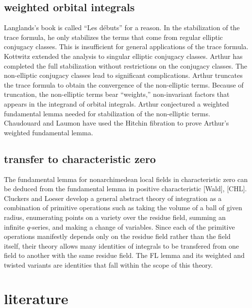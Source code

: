\documentclass[brochure,english,12pt]{bourbaki}
\begin{document}
\subsection{weighted orbital integrals}

Langlands's book is called ``Les d\'ebuts'' for a reason.  In the
stabilization of the trace formula, he only stabilizes the terms that
come from regular elliptic conjugacy classes.  This is insufficient
for general applications of the trace formula.  Kottwitz extended the
analysis to singular elliptic conjugacy classes.  Arthur has
completed the full stabilization without restrictions on the conjugacy
classes.  The non-elliptic conjugacy classes lead to significant
complications.  Arthur truncates the trace formula to obtain the convergence
of the non-elliptic terms.  Because of truncation, the non-elliptic
terms bear ``weights,'' non-invariant factors that appears in the
integrand of orbital integrals.  Arthur conjectured a weighted
fundamental lemma needed for stabilization of the non-elliptic
terms.  Chaudouard and Laumon have used the
Hitchin fibration to prove Arthur's weighted fundamental lemma.


\subsection{transfer to characteristic zero}

The fundamental lemma for nonarchimedean local fields in
characteristic zero can be deduced from the fundamental lemma in
positive characteristic [Wald], [CHL].  Cluckers and Loeser develop a
general abstract theory of integration as a combination of primitive
operations such as taking the volume of a ball of given radius,
enumerating points on a variety over the residue field, summing an
infinite $q$-series, and making a change of variables.  Since
each of the primitive operations manifestly depends only on the
residue field rather than the field itself, their theory allows many
identities of integrals to be transfered from one field to another
with the same residue field.  The FL lemma and its weighted and
twisted variants are identities that fall within the scope of this
theory.

\section{literature}
\end{document}
